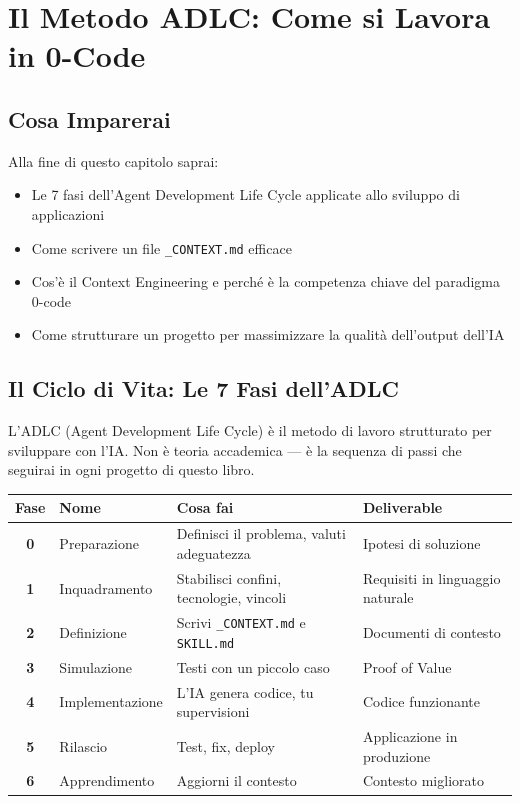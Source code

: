 \chapter{Il Metodo ADLC: Come si Lavora in 0-Code}

\section*{Cosa Imparerai}
Alla fine di questo capitolo saprai:
\begin{itemize}
  \item Le 7 fasi dell'Agent Development Life Cycle applicate allo sviluppo di applicazioni
  \item Come scrivere un file \texttt{\_CONTEXT.md} efficace
  \item Cos'è il Context Engineering e perché è la competenza chiave del paradigma 0-code
  \item Come strutturare un progetto per massimizzare la qualità dell'output dell'IA
\end{itemize}

\section{Il Ciclo di Vita: Le 7 Fasi dell'ADLC}

L'ADLC (Agent Development Life Cycle) è il metodo di lavoro strutturato per sviluppare con l'IA. Non è teoria accademica --- è la sequenza di passi che seguirai in ogni progetto di questo libro.

\begin{small}
\begin{longtable}{c l l l}
\toprule
\textbf{Fase} & \textbf{Nome} & \textbf{Cosa fai} & \textbf{Deliverable} \\
\midrule
\endhead
\textbf{0} & Preparazione & Definisci il problema, valuti adeguatezza & Ipotesi di soluzione \\
\textbf{1} & Inquadramento & Stabilisci confini, tecnologie, vincoli & Requisiti in linguaggio naturale \\
\textbf{2} & Definizione & Scrivi \texttt{\_CONTEXT.md} e \texttt{SKILL.md} & Documenti di contesto \\
\textbf{3} & Simulazione & Testi con un piccolo caso & Proof of Value \\
\textbf{4} & Implementazione & L'IA genera codice, tu supervisioni & Codice funzionante \\
\textbf{5} & Rilascio & Test, fix, deploy & Applicazione in produzione \\
\textbf{6} & Apprendimento & Aggiorni il contesto & Contesto migliorato \\
\bottomrule
\end{longtable}
\end{small}

